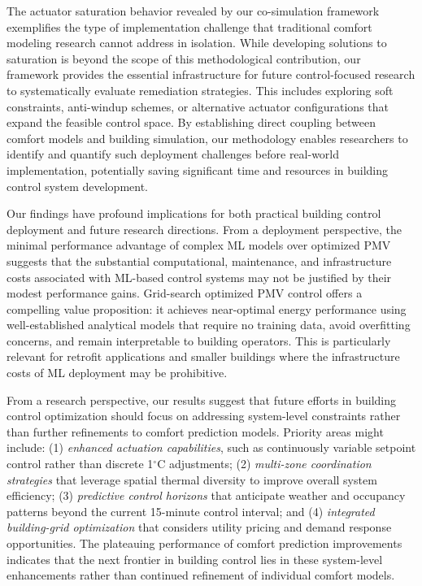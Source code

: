 The actuator saturation behavior revealed by our co-simulation framework exemplifies the type of implementation challenge that traditional comfort modeling research cannot address in isolation. While developing solutions to saturation is beyond the scope of this methodological contribution, our framework provides the essential infrastructure for future control-focused research to systematically evaluate remediation strategies. This includes exploring soft constraints, anti-windup schemes, or alternative actuator configurations that expand the feasible control space. By establishing direct coupling between comfort models and building simulation, our methodology enables researchers to identify and quantify such deployment challenges before real-world implementation, potentially saving significant time and resources in building control system development.

Our findings have profound implications for both practical building control deployment and future research directions. From a deployment perspective, the minimal performance advantage of complex ML models over optimized PMV suggests that the substantial computational, maintenance, and infrastructure costs associated with ML-based control systems may not be justified by their modest performance gains. Grid-search optimized PMV control offers a compelling value proposition: it achieves near-optimal energy performance using well-established analytical models that require no training data, avoid overfitting concerns, and remain interpretable to building operators. This is particularly relevant for retrofit applications and smaller buildings where the infrastructure costs of ML deployment may be prohibitive.

From a research perspective, our results suggest that future efforts in building control optimization should focus on addressing system-level constraints rather than further refinements to comfort prediction models. Priority areas might include: (1) \textit{enhanced actuation capabilities}, such as continuously variable setpoint control rather than discrete 1$^\circ$C adjustments; (2) \textit{multi-zone coordination strategies} that leverage spatial thermal diversity to improve overall system efficiency; (3) \textit{predictive control horizons} that anticipate weather and occupancy patterns beyond the current 15-minute control interval; and (4) \textit{integrated building-grid optimization} that considers utility pricing and demand response opportunities. The plateauing performance of comfort prediction improvements indicates that the next frontier in building control lies in these system-level enhancements rather than continued refinement of individual comfort models.

